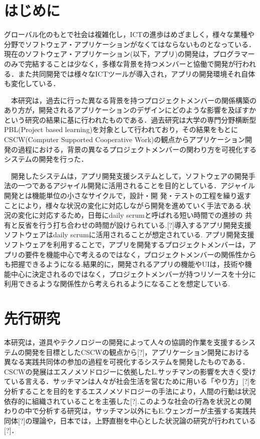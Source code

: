 \documentclass[submit,techrep]{ipsj}
\begin{document}
\maketitle

\section{はじめに}

グローバル化のもとで社会は複雑化し，ICTの進歩はめざましく，様々な業種や分野でソフトウェア・アプリケーションがなくてはならないものとなっている．現在のソフトウェア・アプリケーション(以下，アプリ)の開発は，プログラマーのみで完結することは少なく，多様な背景を持つメンバーと協働で開発が行われる．また共同開発では様々なICTツールが導入され，アプリの開発環境それ自体も変化している．


　本研究は，過去に行った異なる背景を持つプロジェクトメンバーの関係構築のあり方が，開発されるアプリケーションのデザインにどのような影響を及ぼすかという研究の結果に基に行われたものである．過去研究は大学の専門分野横断型PBL(Project based learning)を対象として行われており，その結果をもとにCSCW(Computer Supported Cooperative Work)の観点からアプリケーション開発の過程における，背景の異なるプロジェクトメンバーの関わり方を可視化するシステムの開発を行った．


　開発したシステムは，アプリ開発支援システムとして，ソフトウェアの開発手法の一つであるアジャイル開発に活用されることを目的としている．アジャイル開発とは機能単位の小さなサイクルで，設計・開 発・テストの工程を繰り返すことにより，様々な状況の変化に対応しながら開発を進めていく手法である.状況の変化に対応するため，日毎にdaily scrumと呼ばれる短い時間での進捗の 共有と反省を行う打ち合わせの時間が設けられている.[?]導入するアプリ開発支援ソフトウェアはdaily scrumに活用されることが想定されている.
アプリ開発支援ソフトウェアを利用することで，アプリを開発するプロジェクトメンバーは，アプリの要件を機能中心で考えるのではなく，プロジェクトメンバーの関係性からも把握できるようになる.結果的に，開発されるアプリの機能やUIは，技術や機能中心に決定されるのではなく，プロジェクトメンバーが持つリソースを十分に利用できるような関係性から考えられるようになることを想定している.

\section{先行研究}
\label{previous-research}

本研究は，道具やテクノロジーの開発によって人々の協調的作業を支援するシステムの開発を目標としたCSCWの観点から[?]，アプリケーション開発における異なる実践共同体の参加の過程を可視化するシステムを開発したものである．CSCWの発展はエスノメソドロジーに依拠したL.サッチマンの影響を大きく受けている言える．サッチマンは人々が社会生活を営むために用いる「やり方」[?]を分析することを目的をするエスノメソドロジーの手法により，人間の行動は状況依存的に組織されていることを主張した[?].このような社会の行為を状況との関わりの中で分析する研究は，サッチマン以外にもE.ウェンガーが主張する実践共同体[?]の理論や，日本では，上野直樹を中心とした状況論の研究が行われている[?]．
\end{document}
